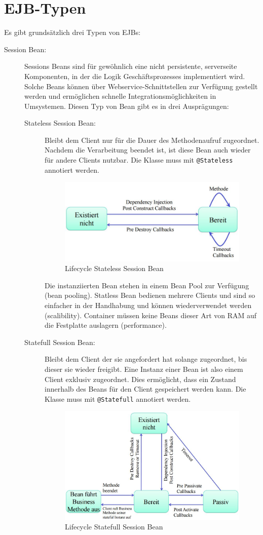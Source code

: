 \section{EJB-Typen}
Es gibt grundsätzlich drei Typen von EJBs:
\begin{description}
	\item[Session Bean:]
		Sessions Beans sind für gewöhnlich eine nicht persistente, serverseite Komponenten, in der die Logik Geschäftsprozesses implementiert wird. Solche Beans können über Webservice-Schnittstellen zur Verfügung gestellt werden und ermöglichen schnelle Integrationsmöglichkeiten in Umsystemen. Diesen Typ von Bean gibt es in drei Ausprägungen:
		\begin{description}
			\item[Stateless Session Bean:] Bleibt dem Client nur für die Dauer des Methodenaufruf zugeordnet. Nachdem die Verarbeitung beendet ist, ist diese Bean auch wieder für andere Clients nutzbar. Die Klasse muss mit \verb|@Stateless| annotiert werden.
			
			\begin{figure}[h!]
			\centering
			\includegraphics[width=0.5\linewidth]{fig/ejb-lifecycle-statless-bean}
			\caption{Lifecycle Stateless Session Bean}
			\label{fig:ejb-lifecycle-stateless-bean}
			\end{figure}
			
			Die instanziierten Bean stehen in einem Bean Pool zur Verfügung (bean pooling). Statless Bean bedienen mehrere Clients und sind so einfacher in der Handhabung und können wiederverwendet werden (scalibility). Container müssen keine Beans dieser Art von RAM auf die Festplatte auslagern (performance).
			
			\item[Statefull Session Bean:] Bleibt dem Client der sie angefordert hat solange zugeordnet, bis dieser sie wieder freigibt. Eine Instanz einer Bean ist also einem Client exklusiv zugeordnet. Dies ermöglicht, dass ein Zustand innerhalb des Beans für den Client gespeichert werden kann. Die Klasse muss mit \verb|@Statefull| annotiert werden.
			
			\begin{figure}[h!]
			\centering
			\includegraphics[width=0.5\linewidth]{fig/ejb-lifecycle-statefull-bean}
			\caption{Lifecycle Statefull Session Bean}
			\label{fig:ejb-lifecycle-statefull-bean}
			\end{figure}
			

\end{description}
\end{description}
